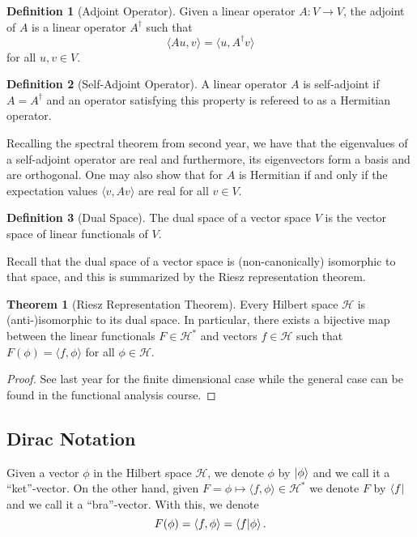 \documentclass[]{article}
\theoremstyle{definition}
\newtheorem{theorem}{Theorem}
\theoremstyle{definition}
\newtheorem{definition}{Definition}[section]
\begin{document}
\begin{definition}[Adjoint Operator]
  Given a linear operator \(A : V \to V\), the adjoint of \(A\) is a linear 
  operator \(A^\dagger\) such that 
  \[\langle A u, v \rangle = \langle u, A^\dagger v \rangle\] 
  for all \(u, v \in V\).
\end{definition}

\begin{definition}[Self-Adjoint Operator]
  A linear operator \(A\) is self-adjoint if \(A = A^\dagger\) and an operator 
  satisfying this property is refereed to as a Hermitian operator.
\end{definition}

Recalling the spectral theorem from second year, we have that the eigenvalues 
of a self-adjoint operator are real and furthermore, its eigenvectors form a 
basis and are orthogonal. One may also show that for \(A\) is Hermitian if and 
only if the expectation values \(\langle v, Av\rangle\) are real for all 
\(v \in V\).

\begin{definition}[Dual Space]
  The dual space of a vector space \(V\) is the vector space of linear 
  functionals of \(V\).
\end{definition}

Recall that the dual space of a vector space is (non-canonically) isomorphic 
to that space, and this is summarized by the Riesz representation theorem.

\begin{theorem}[Riesz Representation Theorem]
  Every Hilbert space \(\mathcal{H}\) is (anti-)isomorphic to its dual space. 
  In particular, there exists a bijective map between the linear functionals 
  \(F \in \mathcal{H}^*\) and vectors \(f \in \mathcal{H}\) such that 
  \(F(\phi) = \langle f, \phi \rangle\) for all \(\phi \in \mathcal{H}\).
\end{theorem}
\begin{proof}
  See last year for the finite dimensional case while the general case can 
  be found in the functional analysis course.
\end{proof}

\subsection{Dirac Notation}

Given a vector \(\phi\) in the Hilbert space \(\mathcal{H}\), we denote 
\(\phi\) by \(\ket{\phi}\) and we call it a ``ket''-vector. On the other hand, 
given \(F = \phi \mapsto \langle f, \phi\rangle \in \mathcal{H}^*\) we 
denote \(F\) by \(\bra{f}\) and we call it a ``bra''-vector. With this, we denote 
\[F(\phi) = \langle f, \phi \rangle = \bra{f} \ket{\phi}.\]
\end{document}
